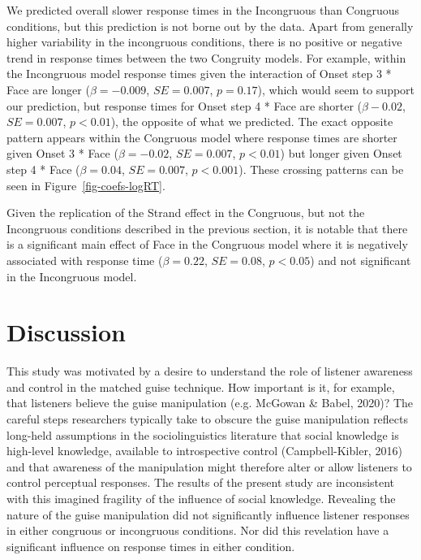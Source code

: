 \documentclass[
  letterpaper,
  DIV=11,
  numbers=noendperiod]{scrartcl}
\begin{document}
We predicted overall slower response times in the Incongruous than
Congruous conditions, but this prediction is not borne out by the data.
Apart from generally higher variability in the incongruous conditions,
there is no positive or negative trend in response times between the two
Congruity models. For example, within the Incongruous model response
times given the interaction of Onset step 3 * Face are longer
(\(β=-0.009\), \(SE=0.007\), \(p = 0.17\)), which would seem to support
our prediction, but response times for Onset step 4 * Face are shorter
(\(β-0.02\), \(SE=0.007\), \(p < 0.01\)), the opposite of what we
predicted. The exact opposite pattern appears within the Congruous model
where response times are shorter given Onset 3 * Face (\(β=-0.02\),
\(SE=0.007\), \(p < 0.01\)) but longer given Onset step 4 * Face
(\(β=0.04\), \(SE=0.007\), \(p < 0.001\)). These crossing patterns can
be seen in Figure~\ref{fig-coefs-logRT}.

Given the replication of the Strand effect in the Congruous, but not the
Incongruous conditions described in the previous section, it is notable
that there is a significant main effect of Face in the Congruous model
where it is negatively associated with response time (\(β=0.22\),
\(SE=0.08\), \(p < 0.05\)) and not significant in the Incongruous model.

\section{Discussion}\label{discussion}

This study was motivated by a desire to understand the role of listener
awareness and control in the matched guise technique. How important is
it, for example, that listeners believe the guise manipulation (e.g.
McGowan \& Babel, 2020)? The careful steps researchers typically take to
obscure the guise manipulation reflects long-held assumptions in the
sociolinguistics literature that social knowledge is high-level
knowledge, available to introspective control (Campbell-Kibler, 2016)
and that awareness of the manipulation might therefore alter or allow
listeners to control perceptual responses. The results of the present
study are inconsistent with this imagined fragility of the influence of
social knowledge. Revealing the nature of the guise manipulation did not
significantly influence listener responses in either congruous or
incongruous conditions. Nor did this revelation have a significant
influence on response times in either condition.
\end{document}
